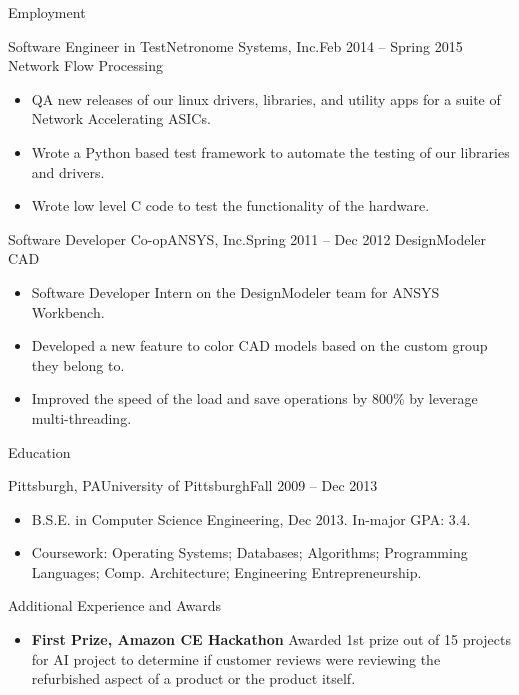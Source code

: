 \documentclass[]{mussocv}
\begin{document}
\begin{cvsection}{Employment}
		\begin{cvsubsection}{Software Engineer in Test}{Netronome Systems, Inc.}{Feb 2014 -- Spring 2015}
			Network Flow Processing
			\begin{itemize}
				\item QA new releases of our linux drivers, libraries, and utility apps for a suite of Network Accelerating ASICs.
				\item Wrote a Python based test framework to automate the testing of our libraries and drivers.
				\item Wrote low level C code to test the functionality of the hardware.
			\end{itemize}
		\end{cvsubsection}

		\begin{cvsubsection}{Software Developer Co-op}{ANSYS, Inc.}{Spring 2011 -- Dec 2012}
			DesignModeler CAD
			\begin{itemize}
				\item Software Developer Intern on the DesignModeler team for ANSYS Workbench. 
				\item Developed a new feature to color CAD models based on the custom group they belong to.
				\item Improved the speed of the load and save operations by 800\% by leverage multi-threading.
			\end{itemize}
		\end{cvsubsection}
	\end{cvsection}
	
	\begin{cvsection}{Education}
		\begin{cvsubsection}{Pittsburgh, PA}{University of Pittsburgh}{Fall 2009 -- Dec 2013}
			\begin{itemize}
				\item B.S.E. in Computer Science Engineering, Dec 2013.  In-major GPA: 3.4.
				\item Coursework: Operating Systems; Databases; Algorithms; Programming Languages; Comp. Architecture; Engineering Entrepreneurship.
			\end{itemize}
		\end{cvsubsection}
	\end{cvsection}
	
	\begin{cvsection}{Additional Experience and Awards}
		\begin{cvsubsection}{}{}{}	
			\begin{itemize}
				\item \textbf{First Prize, Amazon CE Hackathon} Awarded 1st prize out of 15 projects for AI project to determine if customer reviews were reviewing the refurbished aspect of a product or the product itself.
			\end{itemize}
		\end{cvsubsection}
	\end{cvsection}
	
\end{document}

